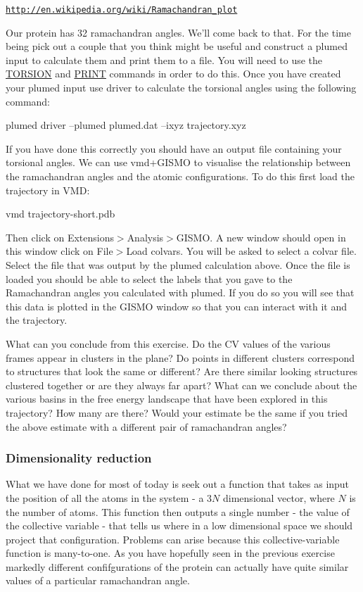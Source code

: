 \href{http://en.wikipedia.org/wiki/Ramachandran_plot}{\tt http\+://en.\+wikipedia.\+org/wiki/\+Ramachandran\+\_\+plot}

Our protein has 32 ramachandran angles. We'll come back to that. For the time being pick out a couple that you think might be useful and construct a plumed input to calculate them and print them to a file. You will need to use the \hyperlink{TORSION}{T\+O\+R\+S\+I\+O\+N} and \hyperlink{PRINT}{P\+R\+I\+N\+T} commands in order to do this. Once you have created your plumed input use driver to calculate the torsional angles using the following command\+:

\begin{DoxyVerb}plumed driver --plumed plumed.dat --ixyz trajectory.xyz
\end{DoxyVerb}


If you have done this correctly you should have an output file containing your torsional angles. We can use vmd+\+G\+I\+S\+M\+O to visualise the relationship between the ramachandran angles and the atomic configurations. To do this first load the trajectory in V\+M\+D\+:

\begin{DoxyVerb}vmd trajectory-short.pdb
\end{DoxyVerb}


Then click on Extensions$>$Analysis$>$G\+I\+S\+M\+O. A new window should open in this window click on File$>$Load colvars. You will be asked to select a colvar file. Select the file that was output by the plumed calculation above. Once the file is loaded you should be able to select the labels that you gave to the Ramachandran angles you calculated with plumed. If you do so you will see that this data is plotted in the G\+I\+S\+M\+O window so that you can interact with it and the trajectory.

What can you conclude from this exercise. Do the C\+V values of the various frames appear in clusters in the plane? Do points in different clusters correspond to structures that look the same or different? Are there similar looking structures clustered together or are they always far apart? What can we conclude about the various basins in the free energy landscape that have been explored in this trajectory? How many are there? Would your estimate be the same if you tried the above estimate with a different pair of ramachandran angles?\hypertarget{belfast-3_dim-red}{}\subsubsection{Dimensionality reduction}\label{belfast-3_dim-red}
What we have done for most of today is seek out a function that takes as input the position of all the atoms in the system -\/ a $3N$ dimensional vector, where $N$ is the number of atoms. This function then outputs a single number -\/ the value of the collective variable -\/ that tells us where in a low dimensional space we should project that configuration. Problems can arise because this collective-\/variable function is many-\/to-\/one. As you have hopefully seen in the previous exercise markedly different confifgurations of the protein can actually have quite similar values of a particular ramachandran angle.

